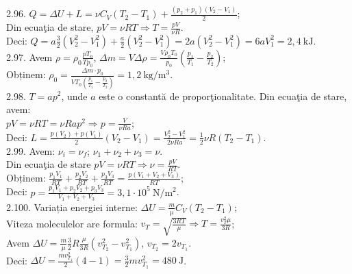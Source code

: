 2.96. $Q=\Delta U+L=\nu C_{V}\left(T_{2}-T_{1}\right)+\frac{\left(p_{2}+p_{1}\right)\left(V_{2}-V_{1}\right)}{2}$;\\ Din ecuaţia de stare,  $p V=\nu R T \Rightarrow T=\frac{p V}{\nu R}$.\\ Deci: $Q=a \frac{3}{2}\left(V_{2}^{2}-V_{1}^{2}\right)+\frac{a}{2}\left(V_{2}^{2}-V_{1}^{2}\right)=2 a\left(V_{2}^{2}-V_{1}^{2}\right)=6 a V_{1}^{2}=2,4 \mathrm{~kJ}$.\\

2.97. Avem $\rho=\rho_{0} \frac{p T_{0}}{T p_{0}}$, $\Delta m=V \Delta \rho=\frac{V \rho_{0} T_{0}}{p_{0}}\left(\frac{p_{1}}{T_{1}}-\frac{p_{2}}{T_{2}}\right)$;\\ Obținem: $\rho_{0}=\frac{\Delta m \cdot p_{0}}{V T_{0}\left(\frac{p_{1}}{T_{1}}-\frac{p_{2}}{T_{2}}\right)}=1,2 \mathrm{~kg} / \mathrm{m}^{3}$.\\

2.98. $T=a p^{2}$, unde $a$ este o constantă de proporţionalitate. Din ecuaţia de stare, avem:\\ $p V=\nu R T=\nu R a p^{2} \Rightarrow p=\frac{V}{\nu R a}$;\\ Deci: $L=\frac{p\left(V_{2}\right)+p\left(V_{1}\right)}{2}\left(V_{2}-V_{1}\right)=\frac{V_{2}^{2}-V_{1}^{2}}{2 \nu R a}=\frac{1}{2} \nu R\left(T_{2}-T_{1}\right)$.\\

2.99. Avem: $\nu_{i}=\nu_{f}$; \quad $\nu_{1}+\nu_{2}+\nu_{3}=\nu$.\\ Din ecuaţia de stare $p V=\nu R T \Rightarrow \nu=\frac{p V}{R T}$.\\ Obținem: $\frac{p_{1} V_{1}}{R T}+\frac{p_{2} V_{2}}{R T}+\frac{p_{3} V_{3}}{R T}=\frac{p\left(V_{1}+V_{2}+V_{3}\right)}{R T}$;\\ Deci: $p=\frac{p_{1} V_{1}+p_{2} V_{2}+p_{3} V_{3}}{V_{1}+V_{2}+V_{3}}=3,1 \cdot 10^{5} \mathrm{~N} / \mathrm{m}^{2}$.\\

2.100. Variația energiei interne: $\Delta U=\frac{m}{\mu} C_{V}\left(T_{2}-T_{1}\right)$;\\ Viteza moleculelor are formula: $v_{T}=\sqrt{\frac{3 R T}{\mu}} \Rightarrow T=\frac{v_{T}^{2} \mu}{3 R}$;\\ Avem $\Delta U=\frac{m}{\mu} \frac{3}{2} R \frac{\mu}{3 R}\left(v_{T_{2}}^{2}-v_{T_{1}}^{2}\right)$, $v_{T_{2}}=2 v_{T_{1}}$.\\ Deci: $\Delta U=\frac{m v_{T_{1}}^{2}}{2}(4-1)=\frac{3}{2} m v_{T_{1}}^{2}=480 \mathrm{~J}$.\\

